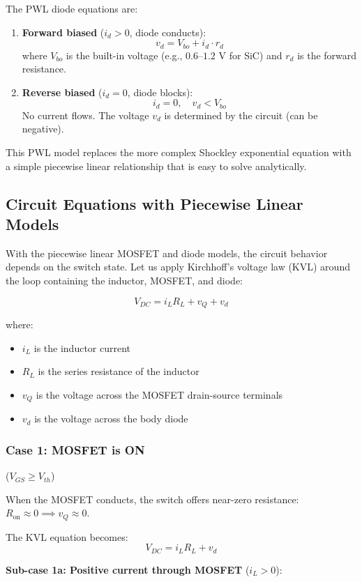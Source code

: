 \documentclass[11pt, a4paper]{article}
\newcommand{\vgs}{V_{GS}}
\newcommand{\vth}{V_{th}}
\newcommand{\ron}{R_{\text{on}}}
\begin{document}
The PWL diode equations are:

\begin{enumerate}
    \item \textbf{Forward biased} ($i_d > 0$, diode conducts):
    \[
        v_d = V_{bo} + i_d \cdot r_d
    \]
    where $V_{bo}$ is the built-in voltage (e.g., $0.6$--$1.2$ V for SiC) and $r_d$ is the forward resistance.

    \item \textbf{Reverse biased} ($i_d = 0$, diode blocks):
    \[
        i_d = 0, \quad v_d < V_{bo}
    \]
    No current flows. The voltage $v_d$ is determined by the circuit (can be negative).
\end{enumerate}

This PWL model replaces the more complex Shockley exponential equation with a simple piecewise linear relationship that is easy to solve analytically.

\subsection{Circuit Equations with Piecewise Linear Models}

With the piecewise linear MOSFET and diode models, the circuit behavior depends on the switch state. Let us apply Kirchhoff's voltage law (KVL) around the loop containing the inductor, MOSFET, and diode:

\[
    V_{DC} = i_L R_L + v_Q + v_d
\]

where:
\begin{itemize}
    \item $i_L$ is the inductor current
    \item $R_L$ is the series resistance of the inductor
    \item $v_Q$ is the voltage across the MOSFET drain-source terminals
    \item $v_d$ is the voltage across the body diode
\end{itemize}

\subsubsection{Case 1: MOSFET is ON} ($\vgs \geq \vth$)

When the MOSFET conducts, the switch offers near-zero resistance: $\ron \approx 0 \implies v_Q \approx 0$.

The KVL equation becomes:
\[
    V_{DC} = i_L R_L + v_d
\]

\textbf{Sub-case 1a: Positive current through MOSFET} ($i_L > 0$):
\end{document}
